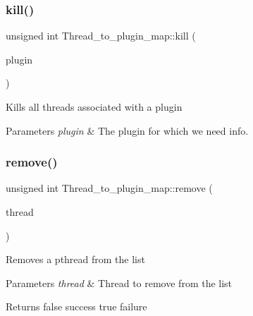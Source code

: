 \subsubsection{\texorpdfstring{kill()}{kill()}}
{\footnotesize\ttfamily unsigned int Thread\+\_\+to\+\_\+plugin\+\_\+map\+::kill (\begin{DoxyParamCaption}\item[{const void $\ast$}]{plugin }\end{DoxyParamCaption})\hspace{0.3cm}{\ttfamily [inline]}}

Kills all threads associated with a plugin


\begin{DoxyParams}{Parameters}
{\em plugin} & The plugin for which we need info. \\
\hline
\end{DoxyParams}
\mbox{\label{classThread__to__plugin__map_aedea66a850c6c690e95c56b9e305dd63}} 
\subsubsection{\texorpdfstring{remove()}{remove()}}
{\footnotesize\ttfamily unsigned int Thread\+\_\+to\+\_\+plugin\+\_\+map\+::remove (\begin{DoxyParamCaption}\item[{my\+\_\+thread\+\_\+t}]{thread }\end{DoxyParamCaption})\hspace{0.3cm}{\ttfamily [inline]}}

Removes a pthread from the list


\begin{DoxyParams}{Parameters}
{\em thread} & Thread to remove from the list\\
\hline
\end{DoxyParams}
\begin{DoxyReturn}{Returns}
false success true failure 
\end{DoxyReturn}
\mbox{\label{classThread__to__plugin__map_af09cfc90c390b4e58386f0ea2ae18d50}} 
